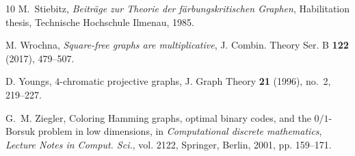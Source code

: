 \documentclass[12pt,letterpaper]{amsart}
\theoremstyle{definition}
\theoremstyle{remark}
\begin{document}
\begin{thebibliography}{10}
M.~Stiebitz, \emph{Beitr{\"a}ge zur {T}heorie der f{\"a}rbungskritischen
  {G}raphen}, Habilitation thesis, Technische Hochschule Ilmenau, 1985.

M. Wrochna, \emph{Square-free graphs are multiplicative}, J. Combin. Theory Ser. B \textbf{122} (2017), 479--507.

D. Youngs, $4$-chromatic projective graphs, J. Graph Theory {\bf 21} (1996), no.~2, 219--227.

G.~M. Ziegler, Coloring {H}amming graphs, optimal binary codes, and the
  {$0/1$}-{B}orsuk problem in low dimensions, in \emph{Computational discrete
  mathematics}, \emph{Lecture Notes in Comput. Sci.}, vol. 2122, Springer,
  Berlin, 2001, pp. 159--171.

\end{thebibliography}
\end{document}
